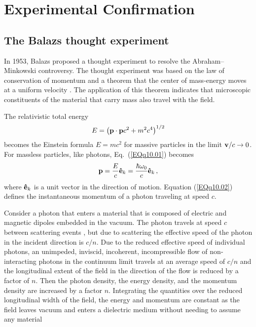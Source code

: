 \documentclass[twocolumn,amssymb,eqsecnum,aps,pra]{revtex4-2}
\begin{document}
\section{Experimental Confirmation}
\par
\subsection{The Balazs thought experiment}
\par
In 1953, Balazs \cite{BIBalazs} proposed a thought experiment to
resolve the Abraham--Minkowski controversy.
The thought experiment was based on the law of conservation of momentum
and a theorem that the center of mass-energy moves at a uniform
velocity \cite{BIBoyer}.
The application of this theorem indicates that microscopic constituents
of the material that carry mass also travel with the field.
\par
The relativistic total energy
\begin{equation}
E=\left ( {\bf p}\cdot{\bf p}c^2+m^2c^4 \right )^{1/2}
\label{EQq10.01}
\end{equation}
becomes the Einstein formula $E=mc^2$ for massive particles
in the limit ${\bf v}/c \rightarrow 0$.
For massless particles, like photons, Eq.~(\ref{EQq10.01}) becomes
\begin{equation}
{\bf p}=\frac{E}{c} {\bf \hat e}_k =
\frac{\hbar\omega_0}{c} {\bf \hat e}_k \, ,
\label{EQq10.02}
\end{equation}
where ${\bf \hat e}_k$ is a unit vector in the direction of motion.
Equation (\ref{EQq10.02}) defines the instantaneous momentum of a
photon traveling at speed $c$.
\par
Consider a photon that enters a material that is composed of electric
and magnetic dipoles embedded in the vacuum.
The photon travels at speed $c$ between scattering
events \cite{BIFeynman}, but due to scattering the effective speed
of the photon in the incident direction is $c/n$.
Due to the reduced effective speed of individual photons, an unimpeded,
inviscid, incoherent, incompressible flow of non-interacting photons in
the continuum limit travels at an average speed of $c/n$ and the
longitudinal extent of the field in the direction of the flow is
reduced by a factor of $n$.
Then the photon density, the energy density, and the momentum density
are increased by a factor $n$.
Integrating the quantities over the reduced longitudinal width of the
field, the energy and momentum are constant as the field leaves vacuum
and enters a dielectric medium without needing to assume any material
\end{document}
